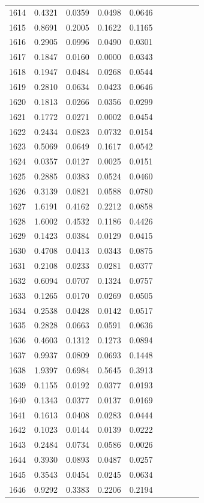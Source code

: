 \begin{table}
\begin{tabular}{cccccccccc}
1614& 0.4321& 0.0359& 0.0498& 0.0646\\ 
1615& 0.8691& 0.2005& 0.1622& 0.1165\\ 
1616& 0.2905& 0.0996& 0.0490& 0.0301\\ 
1617& 0.1847& 0.0160& 0.0000& 0.0343\\ 
1618& 0.1947& 0.0484& 0.0268& 0.0544\\ 
1619& 0.2810& 0.0634& 0.0423& 0.0646\\ 
1620& 0.1813& 0.0266& 0.0356& 0.0299\\ 
1621& 0.1772& 0.0271& 0.0002& 0.0454\\ 
1622& 0.2434& 0.0823& 0.0732& 0.0154\\ 
1623& 0.5069& 0.0649& 0.1617& 0.0542\\ 
1624& 0.0357& 0.0127& 0.0025& 0.0151\\ 
1625& 0.2885& 0.0383& 0.0524& 0.0460\\ 
1626& 0.3139& 0.0821& 0.0588& 0.0780\\ 
1627& 1.6191& 0.4162& 0.2212& 0.0858\\ 
1628& 1.6002& 0.4532& 0.1186& 0.4426\\ 
1629& 0.1423& 0.0384& 0.0129& 0.0415\\ 
1630& 0.4708& 0.0413& 0.0343& 0.0875\\ 
1631& 0.2108& 0.0233& 0.0281& 0.0377\\ 
1632& 0.6094& 0.0707& 0.1324& 0.0757\\ 
1633& 0.1265& 0.0170& 0.0269& 0.0505\\ 
1634& 0.2538& 0.0428& 0.0142& 0.0517\\ 
1635& 0.2828& 0.0663& 0.0591& 0.0636\\ 
1636& 0.4603& 0.1312& 0.1273& 0.0894\\ 
1637& 0.9937& 0.0809& 0.0693& 0.1448\\ 
1638& 1.9397& 0.6984& 0.5645& 0.3913\\ 
1639& 0.1155& 0.0192& 0.0377& 0.0193\\ 
1640& 0.1343& 0.0377& 0.0137& 0.0169\\ 
1641& 0.1613& 0.0408& 0.0283& 0.0444\\ 
1642& 0.1023& 0.0144& 0.0139& 0.0222\\ 
1643& 0.2484& 0.0734& 0.0586& 0.0026\\ 
1644& 0.3930& 0.0893& 0.0487& 0.0257\\ 
1645& 0.3543& 0.0454& 0.0245& 0.0634\\ 
1646& 0.9292& 0.3383& 0.2206& 0.2194\\ 

\end{tabular}
\end{table}
